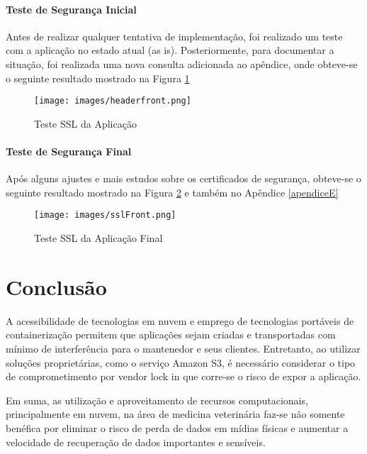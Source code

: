 \documentclass[
    12pt,               %
    openright,          %
    oneside,
    a4paper,            %
    BIBLATEX,           %
    TODO,               %
    english,            %
    brazil              %
    ]{ifsp-spo-inf-ctds}
\begin{document}
    \subsubsection{ Teste de Segurança Inicial}

    Antes de realizar qualquer tentativa de implementação, foi realizado um teste com a aplicação no estado atual (as is). Posteriormente, para documentar a situação, foi realizada uma nova consulta adicionada ao apêndice, onde obteve-se o seguinte resultado mostrado na Figura \ref{fig:sslFront}

    \begin{figure}[H]
        \centering
        \texttt{[image: images/headerfront.png]}
        \caption{Teste SSL da Aplicação}
        \label{fig:sslFront}
    \end{figure}    

    \subsubsection{Teste de Segurança Final}

    Após alguns ajustes e mais estudos sobre os certificados de segurança, obteve-se o seguinte resultado mostrado na Figura \ref{fig:sslFrontfinal} e também no Apêndice \ref{apendiceE}

    \begin{figure}[H]
        \centering
        \texttt{[image: images/sslFront.png]}
        \caption{Teste SSL da Aplicação Final}
        \label{fig:sslFrontfinal}
    \end{figure}


\chapter[Conclusão]{Conclusão}

    A acessibilidade de tecnologias em nuvem e emprego de tecnologias portáveis de containerização permitem que aplicações sejam criadas e transportadas com mínimo de interferência para o mantenedor e seus clientes. Entretanto, ao utilizar soluções proprietárias, como o serviço Amazon S3, é necessário considerar o tipo de comprometimento por vendor lock in que corre-se o risco de expor a aplicação.

    Em suma, as utilização e aproveitamento de recursos computacionais, principalmente em nuvem, na área de medicina veterinária faz-se não somente benéfica por eliminar o risco de perda de dados em mídias físicas e aumentar a velocidade de recuperação de dados importantes e sensíveis.
\end{document}
